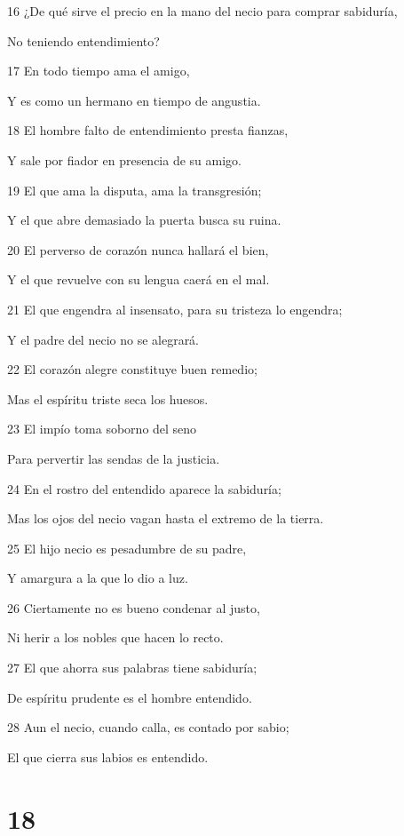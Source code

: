 \par 16 ¿De qué sirve el precio en la mano del necio para comprar sabiduría,
\par No teniendo entendimiento?
\par 17 En todo tiempo ama el amigo,
\par Y es como un hermano en tiempo de angustia. 
\par 18 El hombre falto de entendimiento presta fianzas,
\par Y sale por fiador en presencia de su amigo.
\par 19 El que ama la disputa, ama la transgresión;
\par Y el que abre demasiado la puerta busca su ruina.
\par 20 El perverso de corazón nunca hallará el bien,
\par Y el que revuelve con su lengua caerá en el mal.
\par 21 El que engendra al insensato, para su tristeza lo engendra;
\par Y el padre del necio no se alegrará.
\par 22 El corazón alegre constituye buen remedio;
\par Mas el espíritu triste seca los huesos.
\par 23 El impío toma soborno del seno
\par Para pervertir las sendas de la justicia.
\par 24 En el rostro del entendido aparece la sabiduría;
\par Mas los ojos del necio vagan hasta el extremo de la tierra.
\par 25 El hijo necio es pesadumbre de su padre,
\par Y amargura a la que lo dio a luz.
\par 26 Ciertamente no es bueno condenar al justo,
\par Ni herir a los nobles que hacen lo recto.
\par 27 El que ahorra sus palabras tiene sabiduría;
\par De espíritu prudente es el hombre entendido.
\par 28 Aun el necio, cuando calla, es contado por sabio;
\par El que cierra sus labios es entendido. 

\chapter{18}


